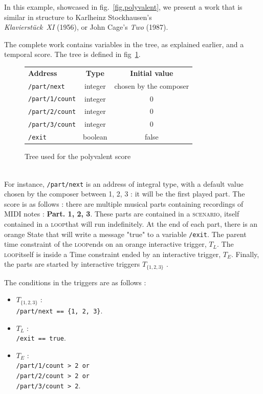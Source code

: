 \documentclass{article}
\newcommand{\scenario}{\textsc{scenario}}
\newcommand{\Loop}{\textsc{loop}}
\begin{document}
In this example, showcased in fig.~\ref{fig.polyvalent}, we present a work that is similar in structure to Karlheinz Stockhausen's~\\ \emph{Klavierstück~XI} (1956), or John Cage's \emph{Two} (1987). 

The complete work contains variables in the tree, as explained earlier, and a temporal score.
The tree is defined in fig~\ref{fig.tablescore}.
\begin{figure}[h]
    \begin{tabular}{lcc}        
        \textbf{Address} & \textbf{Type} & \textbf{Initial value} \\
        \lstinline|/part/next|    & integer & chosen by the composer \\
        \lstinline|/part/1/count| & integer & 0 \\
        \lstinline|/part/2/count| & integer & 0 \\
        \lstinline|/part/3/count| & integer & 0 \\
        \lstinline|/exit|         & boolean & false
    \end{tabular}
    \caption{Tree used for the polyvalent score}
    \label{fig.tablescore}
\end{figure}~\\
For instance, \lstinline{/part/next} is an address of integral type, with a default value chosen by the composer between 1, 2, 3 : it will be the first played part. 
The score is as follows : there are multiple musical parts containing recordings of MIDI notes : \textbf{Part. 1, 2, 3}.
These parts are contained in a \scenario, itself contained in a \Loop that will run indefinitely. 
At the end of each part, there is an orange State that will write a message "true" to a variable \lstinline{/exit}.
The parent time constraint of the \Loop ends on an orange interactive trigger, $T_{L}$.
The \Loop itself is inside a Time constraint ended by an interactive trigger, $T_{E}$.
Finally, the parts are started by interactive triggers  $T_{\{1, 2, 3\}}$ .
 
The conditions in the triggers are as follows : 
\begin{itemize}
\item  $T_{\{1, 2, 3\}}$ : ~\\ \lstinline|/part/next == {1, 2, 3}|.
\item $T_{L}$ : ~\\ \lstinline{/exit == true}.
\item $T_{E}$ : ~\\
\lstinline{/part/1/count > 2 or} \\
\lstinline{/part/2/count > 2 or} \\
\lstinline{/part/3/count > 2}.
\end{itemize}
\end{document}
